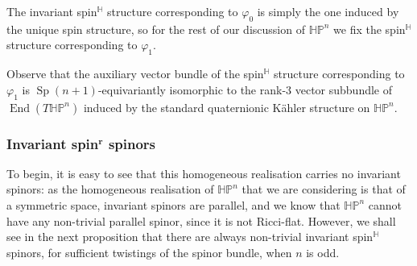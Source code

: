\documentclass[pdftex]{sigma}
\numberwithin{equation}{section}
\DeclareMathOperator{\Sp}{Sp}
\DeclareMathOperator{\End}{End}
\begin{document}
		The invariant spin$^{\mathbb{H}}$ structure corresponding to $\varphi_0$ is simply the one induced by the unique spin structure, so for the rest of our discussion of $\mathbb{HP}^n$ we fix the spin$^{\mathbb{H}}$ structure corresponding to $\varphi_1$.
		
		\begin{Remark} \label{rem:hpn_aux}
			Observe that the auxiliary vector bundle of the spin$^{\mathbb{H}}$ structure corresponding to~$\varphi_1$ is $\Sp(n+1)$-equivariantly isomorphic to the rank-$3$ vector subbundle of $\End(T \mathbb{HP}^n)$ induced by the standard quaternionic K\"{a}hler structure on $\mathbb{HP}^n$.
		\end{Remark}
		
		\subsubsection[Invariant spin\^{}r spinors]{Invariant spin$^{\boldsymbol{r}}$ spinors}
		

		To begin, it is easy to see that this homogeneous realisation carries no invariant spinors: as the homogeneous realisation of $\mathbb{HP}^n$ that we are considering is that of a symmetric space, invariant spinors are parallel, and we know that $\mathbb{HP}^n$ cannot have any non-trivial parallel spinor, since it is not Ricci-flat. However, we shall see in the next proposition that there are always non-trivial invariant spin$^{\mathbb{H}}$ spinors, for sufficient twistings of the spinor bundle, when $n$ is odd.
\end{document}
